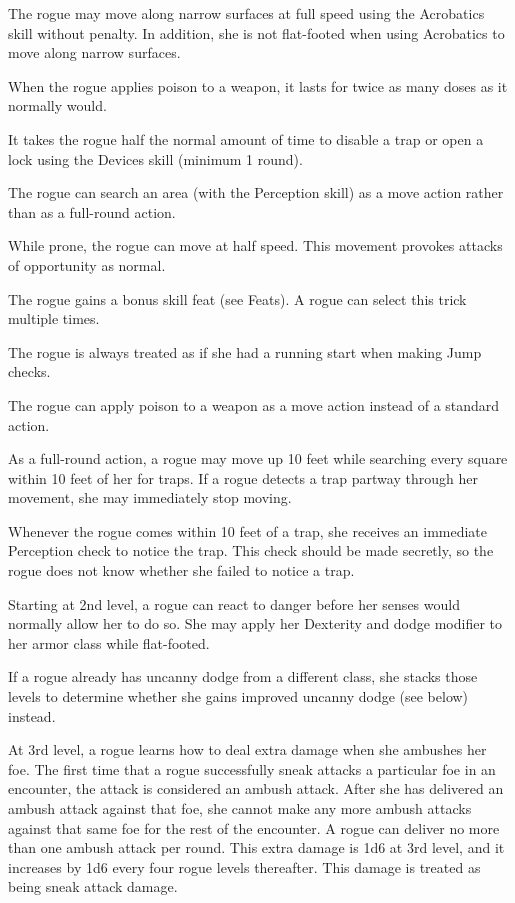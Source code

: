  The rogue may move along narrow surfaces at full speed using the Acrobatics skill without penalty. In addition, she is not flat-footed when using Acrobatics to move along narrow surfaces.

 When the rogue applies poison to a weapon, it lasts for twice as many doses as it normally would.

 It takes the rogue half the normal amount of time to disable a trap or open a lock using the Devices skill (minimum 1 round).

 The rogue can search an area (with the Perception skill) as a move action rather than as a full-round action.

 While prone, the rogue can move at half speed. This movement provokes attacks of opportunity as normal.

 The rogue gains a bonus skill feat (see Feats). A rogue can select this trick multiple times.

 The rogue is always treated as if she had a running start when making Jump checks.

 The rogue can apply poison to a weapon as a move action instead of a standard action.

 As a full-round action, a rogue may move up 10 feet while searching every square within 10 feet of her for traps. If a rogue detects a trap partway through her movement, she may immediately stop moving.

 Whenever the rogue comes within 10 feet of a trap, she receives an immediate Perception check to notice the trap. This check should be made secretly, so the rogue does not know whether she failed to notice a trap.

 Starting at 2nd level, a rogue can react to danger before her senses would normally allow her to do so. She may apply her Dexterity and dodge modifier to her armor class while flat-footed.

If a rogue already has uncanny dodge from a different class, she stacks those levels to determine whether she gains improved uncanny dodge (see below) instead.

 At 3rd level, a rogue learns how to deal extra damage when she ambushes her foe. The first time that a rogue successfully sneak attacks a particular foe in an encounter, the attack is considered an ambush attack. After she has delivered an ambush attack against that foe, she cannot make any more ambush attacks against that same foe for the rest of the encounter. A rogue can deliver no more than one ambush attack per round. This extra damage is 1d6 at 3rd level, and it increases by 1d6 every four rogue levels thereafter. This damage is treated as being sneak attack damage.


